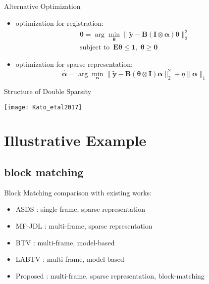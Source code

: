 \documentclass[fleqn,aspectratio=1610]{beamer}
\begin{document}
\begin{frame}[label={sec:org809f396}]{Alternative Optimization}
\begin{itemize}
\item optimization for registration:
\begin{multline}
  \tag{20}
  \hat{\boldsymbol{\theta}}
  =
  \arg\min_{\boldsymbol{\theta}}
  \|\tilde{\boldsymbol{y}}-{\mathbf{B}}
  (\mathbf{I}\otimes\boldsymbol{\alpha})\boldsymbol{\theta}\|_{2}^{2} \\
  \text{subject to }\,
  \mathbf{E}\boldsymbol{\theta}\leq\mathbf{1},
  \;\boldsymbol{\theta}\geq\mathbf{0}
\end{multline}
\item optimization for sparse representation:
\begin{equation}
  \tag{21}
  \hat{\boldsymbol{\alpha}}
  =
  \arg\min_{\boldsymbol{\alpha}}
  \|\tilde{\boldsymbol{y}}-{\mathbf{B}}
  (\boldsymbol{\theta}\otimes\mathbf{I})\boldsymbol{\alpha}\|_{2}^{2}
  +\eta\|\boldsymbol{\alpha}\|_{1}
\end{equation}
\end{itemize}
\end{frame}


\begin{frame}[label={sec:orgac7725e}]{Structure of Double Sparsity}
\begin{center}
\texttt{[image: Kato\_etal2017]}
\end{center}
\end{frame}

\section{Illustrative Example}
\label{sec:org94b62e3}
\subsection{block matching}
\label{sec:org8ae2fd0}
\begin{frame}[label={sec:org2e8b873}]{Block Matching}
comparison with existing works:
\begin{itemize}
\item ASDS \parencite{Dong_etal2011}:
single-frame, sparse representation
\item MF-JDL \parencite{Wang_etal2011}:
multi-frame, sparse representation
\item BTV \parencite{Farsiu_etal2004}:
multi-frame, model-based
\item LABTV \parencite{Li_etal2010}:
multi-frame, model-based
\item Proposed \parencite{KatoHinoMurata2015}:
multi-frame, sparse representation, block-matching
\end{itemize}
\end{frame}
\end{document}

